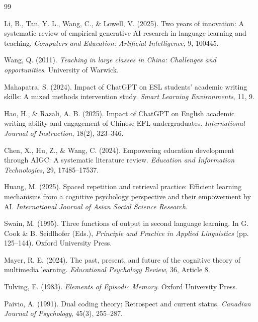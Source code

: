 \documentclass[Afour,sageapa,times]{sagej}
\begin{document}
\begin{thebibliography}{99}

Li, B., Tan, Y. L., Wang, C., \& Lowell, V. (2025). Two years of innovation: A systematic review of empirical generative AI research in language learning and teaching. \textit{Computers and Education: Artificial Intelligence}, 9, 100445.

Wang, Q. (2011). \textit{Teaching in large classes in China: Challenges and opportunities}. University of Warwick.

Mahapatra, S. (2024). Impact of ChatGPT on ESL students' academic writing skills: A mixed methods intervention study. \textit{Smart Learning Environments}, 11, 9.

Hao, H., \& Razali, A. B. (2025). Impact of ChatGPT on English academic writing ability and engagement of Chinese EFL undergraduates. \textit{International Journal of Instruction}, 18(2), 323--346.

Chen, X., Hu, Z., \& Wang, C. (2024). Empowering education development through AIGC: A systematic literature review. \textit{Education and Information Technologies}, 29, 17485--17537.

Huang, M. (2025). Spaced repetition and retrieval practice: Efficient learning mechanisms from a cognitive psychology perspective and their empowerment by AI. \textit{International Journal of Asian Social Science Research}.

Swain, M. (1995). Three functions of output in second language learning. In G. Cook \& B. Seidlhofer (Eds.), \textit{Principle and Practice in Applied Linguistics} (pp. 125--144). Oxford University Press.

Mayer, R. E. (2024). The past, present, and future of the cognitive theory of multimedia learning. \textit{Educational Psychology Review}, 36, Article 8.

Tulving, E. (1983). \textit{Elements of Episodic Memory}. Oxford University Press.

Paivio, A. (1991). Dual coding theory: Retrospect and current status. \textit{Canadian Journal of Psychology}, 45(3), 255--287.


\end{thebibliography}
\end{document}
